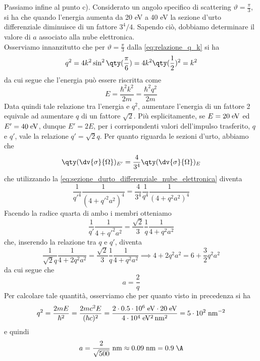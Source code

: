 \begin{soluzione}
   Passiamo infine al punto c). Considerato un angolo specifico di scattering $\vartheta=\frac{\pi}{3}$, si ha che quando l'energia aumenta da 20 eV a 40 eV la sezione d'urto differenziale diminuisce di un fattore $3^4/4$. Sapendo ciò, dobbiamo determinare il valore di $a$ associato alla nube elettronica.\\
   Osserviamo innanzitutto che per $\vartheta=\frac{\pi}{3}$ dalla \eqref{eq:relazione_q_k} si ha
   \begin{equation*}
      q^2
      =4 k^2 \sin^2{ \qty( \frac{\pi}{6} ) }
      =4 k^2 \qty( \frac{1}{2} )^2
      =k^2
   \end{equation*}
   da cui segue che l'energia può essere riscritta come
   \begin{equation*}
      E
      =\frac{\hbar^2 k^2}{2m}
      =\frac{\hbar^2 q^2}{2m}
   \end{equation*}
   Data quindi tale relazione tra l'energia e $q^2$, aumentare l'energia di un fattore 2 equivale ad aumentare $q$ di un fattore $\sqrt{2}$. Più esplicitamente, se $E=20 \rm \; eV$ ed $E'=40 \rm \; eV$, dunque $E'=2E$, per i corrispondenti valori dell'impulso trasferito, $q$ e $q'$, vale la relazione $q'=\sqrt{2}q$. Per quanto riguarda le sezioni d'urto, abbiamo che
   \begin{equation*}
      \qty( \dv{\sigma}{\Omega} )_{E'}
      =\frac{4}{3^4} \qty( \dv{\sigma}{\Omega} )_{E}
   \end{equation*}
   che utilizzando la \eqref{eq:sezione_durto_differenziale_nube_elettronica} diventa
   \begin{equation*}
      \frac{1}{{q'}^4} \frac{1}{(4 + {q'}^2 a^2)^4}
      =\frac{4}{3^4} \frac{1}{q^4} \frac{1}{(4 + q^2 a^2)^4}
   \end{equation*}
   Facendo la radice quarta di ambo i membri otteniamo
   \begin{equation*}
      \frac{1}{q'} \frac{1}{4 + {q'}^2 a^2}
      =\frac{\sqrt{2}}{3} \frac{1}{q} \frac{1}{4 + q^2 a^2}
   \end{equation*}
   che, inserendo la relazione tra $q$ e $q'$, diventa
   \begin{equation*}
      \frac{1}{\sqrt{2}q} \frac{1}{4 + 2q^2 a^2}
      =\frac{\sqrt{2}}{3} \frac{1}{q} \frac{1}{4 + q^2 a^2}
      \implies
      4 + 2q^2 a^2
      =6 + \frac{3}{2} q^2 a^2
   \end{equation*}
   da cui segue che
   \begin{equation*}
      a
      =\frac{2}{q}
   \end{equation*}
   Per calcolare tale quantità, osserviamo che per quanto visto in precedenza si ha
   \begin{equation*}
      q^2
      =\frac{2mE}{\hbar^2}
      =\frac{2mc^2 E}{(\hbar c)^2}
      =\rm \frac{2 \cdot 0.5 \cdot 10^6 \; eV \cdot 20 \; eV}{4 \cdot 10^4 \; eV^2 \, nm^2}
      =\rm 5 \cdot 10^2 \; nm^{-2}
   \end{equation*}
   e quindi
   \begin{equation*}
      a
      =\rm \frac{2}{\sqrt{500}} \; nm
      \approx 0.09 \rm \; nm
      =0.9 \; \text{\A}
   \end{equation*}
\end{soluzione}

